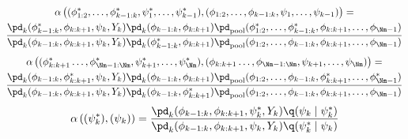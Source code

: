 \begin{multline}
  \alpha \left(
    (\phi_{1:2}^{*}, \ldots, \phi_{k - 1:k}^{*}, \psi_{1}^{*}, \ldots, \psi_{k - 1}^{*}),
    (\phi_{1:2}, \ldots, \phi_{k - 1:k}, \psi_{1}, \ldots, \psi_{k - 1})
  \right)
  =\\ 
  \frac {
    \pd_{k}(\phi_{k - 1:k}^{*}, \phi_{k:k + 1}, \psi_{k}, Y_{k})
    \pd_{k}(\phi_{k - 1:k}, \phi_{k:k + 1})
    \pd_{\text{pool}}(\phi_{1:2}^{*}, \ldots, \phi_{k - 1:k}^{*}, \phi_{k:k + 1}, \ldots, \phi_{\Nm - 1})
  } {
    \pd_{k}(\phi_{k - 1:k}, \phi_{k:k + 1}, \psi_{k}, Y_{k})
    \pd_{k}(\phi_{k - 1:k}^{*}, \phi_{k:k + 1})
    \pd_{\text{pool}}(\phi_{1:2}, \ldots, \phi_{k - 1:k}, \phi_{k:k + 1}, \ldots, \phi_{\Nm - 1})
  }
  \end{multline}
  \begin{multline}
  \alpha \left(
    (\phi_{k:k + 1}^{*} \ldots, \phi_{\Nm - 1:\Nm}^{*}, \psi_{k + 1}^{*}, \ldots, \psi_{\Nm}^{*}),
    (\phi_{k:k + 1} \ldots, \phi_{\Nm - 1:\Nm}, \psi_{k + 1}, \ldots, \psi_{\Nm})
  \right)
  =\\
  \frac {
    \pd_{k}(\phi_{k - 1:k}, \phi_{k:k + 1}^{*}, \psi_{k}, Y_{k})
    \pd_{k}(\phi_{k - 1:k}, \phi_{k:k + 1})
    \pd_{\text{pool}}(\phi_{1:2}, \ldots, \phi_{k - 1:k}, \phi_{k:k + 1}^{*}, \ldots, \phi_{\Nm - 1}^{*})
  } {
    \pd_{k}(\phi_{k - 1:k}, \phi_{k:k + 1}, \psi_{k}, Y_{k})
    \pd_{k}(\phi_{k - 1:k}, \phi_{k:k + 1}^{*})
    \pd_{\text{pool}}(\phi_{1:2}, \ldots, \phi_{k - 1:k}, \phi_{k:k + 1}, \ldots, \phi_{\Nm - 1})
  } 
  \end{multline}
  \begin{equation}
  \alpha \left(
    (\psi_{k}^{*}),
    (\psi_{k})
  \right)
  = 
  \frac {
    \pd_{k}(\phi_{k - 1:k}, \phi_{k:k + 1}, \psi_{k}^{*}, Y_{k})
    \q(\psi_{k} \mid \psi_{k}^{*})
  } {
    \pd_{k}(\phi_{k - 1:k}, \phi_{k:k + 1}, \psi_{k}, Y_{k})
    \q(\psi_{k}^{*} \mid \psi_{k})
  }
  \label{eqn:dc-acceptance-probabilities}
\end{equation}